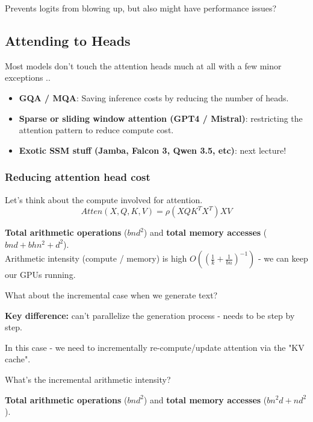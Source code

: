 \documentclass[12pt,twoside]{article}
\begin{document}
Prevents logits from blowing up, but also might have performance issues?

\subsection*{Attending to Heads}

Most models don't touch the attention heads much at all with a few minor exceptions ..

\begin{itemize}
    \item \textbf{GQA / MQA}: Saving inference costs by reducing the number of heads.
    \item \textbf{Sparse or sliding window attention (GPT4 / Mistral)}: restricting the attention pattern to reduce compute cost.
    \item \textbf{Exotic SSM stuff (Jamba, Falcon 3, Qwen 3.5, etc)}: next lecture!
\end{itemize}

\subsubsection*{Reducing attention head cost}

Let's think about the compute involved for attention.
\[
    Atten(X, Q, K, V) = \rho(XQK^TX^T)XV
\]

\textbf{Total arithmetic operations} (\(bnd^2\)) and \textbf{total memory accesses} (\(bnd + bhn^2 + d^2\)). \\

Arithmetic intensity (compute / memory) is high \(O\left((\frac{1}{k} + \frac{1}{bn})^{-1}\right)\) - we can keep our GPUs running.

\begin{question}
    What about the incremental case when we generate text?
\end{question}

\textbf{Key difference:} can't parallelize the generation process - needs to be step by step. 

\begin{remark}
    In this case - we need to incrementally re-compute/update attention via the "KV cache".
\end{remark}

\begin{question}
    What's the incremental arithmetic intensity?  
\end{question}

\textbf{Total arithmetic operations} (\(bnd^2\)) and \textbf{total memory accesses} (\(bn^2d + nd^2\)). \\
\end{document}
